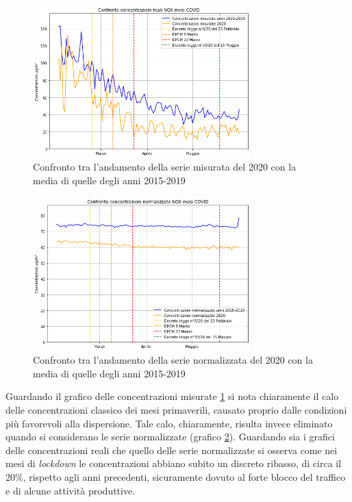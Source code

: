 \documentclass[a4paper]{report}
\begin{document}
\begin{figure}[h]
\centering
\includegraphics[width=0.75\textwidth]{nox_covid}
\caption{Confronto tra l'andamento della serie misurata del 2020 con la media di quelle degli anni 2015-2019}
\label{fig:nox_covid}
\end{figure}

\begin{figure}[h]
\centering
\includegraphics[width=0.75\textwidth]{nox_covid_norm}
\caption{Confronto tra l'andamento della serie normalizzata del 2020 con la media di quelle degli anni 2015-2019}
\label{fig:nox_covid_norm}
\end{figure}

Guardando il grafico delle concentrazioni misurate \ref{fig:nox_covid} si nota chiaramente il calo delle concentrazioni classico dei mesi primaverili, causato proprio dalle condizioni più favorevoli alla dispersione. Tale calo, chiaramente, risulta invece eliminato quando si considerano le serie normalizzate (grafico \ref{fig:nox_covid_norm}).
Guardando sia i grafici delle concentrazioni reali che quello delle serie normalizzate si osserva come nei mesi di \textit{lockdown} le concentrazioni abbiano subito un discreto ribasso, di circa il 20\%, rispetto agli anni precedenti, sicuramente dovuto al forte blocco del traffico e di alcune attività produttive.
\end{document}
